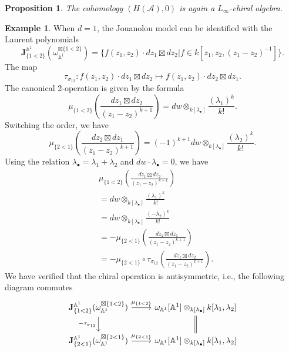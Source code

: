 \documentclass[11pt]{amsart}
\newtheorem{prop}[thm]{Proposition}
\theoremstyle{definition}
\newtheorem{exa}[thm]{Example}
\theoremstyle{remark}
\numberwithin{equation}{section}
\begin{document}
\begin{prop}
The cohomology $\left(H(\mathcal{A}),0\right)$ is again a $L_{\infty}$-chiral algebra.
\end{prop}
\begin{exa}
When $d=1$, the Jouanolou model can be identified with the Laurent polynomials
$$
\mathbf{J}^{\mathbb{A}^1}_{\{1<2\}}(\omega_{\mathbb{A}^1}^{\boxtimes\{1<2\}})=\{f(z_1,z_2)\cdot dz_1\boxtimes dz_2|f\in k[z_1,z_2,(z_1-z_2)^{-1}]\}.
$$
The map
$$
\tau_{\sigma_{12}}:f(z_1,z_2)\cdot dz_1\boxtimes dz_2\mapsto f(z_1,z_2)\cdot dz_2\boxtimes dz_1.
$$
The canonical 2-operation is given by the formula
$$
\mu_{\{1<2\}}\left(\frac{dz_1\boxtimes dz_2}{(z_1-z_2)^{k+1}}\right)=dw\otimes_{k[\lambda_{\bullet}]}\frac{(\lambda_1)^k}{k!}.
$$
Switching the order, we have
$$
\mu_{\{2<1\}}\left(\frac{dz_2\boxtimes dz_1}{(z_1-z_2)^{k+1}}\right)=(-1)^{k+1}dw\otimes_{k[\lambda_{\bullet}]}\frac{(\lambda_2)^k}{k!}.
$$
Using the relation $\lambda_{\bullet}=\lambda_1+\lambda_2$ and $dw\cdot \lambda_{\bullet}=0$, we have
\begin{align*}
   & \mu_{\{1<2\}}\left(\frac{dz_1\boxtimes dz_2}{(z_1-z_2)^{k+1}}\right)\\
   & =dw\otimes_{k[\lambda_{\bullet}]}\frac{(\lambda_1)^k}{k!}\\
   &=dw\otimes_{k[\lambda_{\bullet}]}\frac{(-\lambda_2)^k}{k!}\\
   &=-\mu_{\{2<1\}}\left(\frac{dz_2\boxtimes dz_1}{(z_1-z_2)^{k+1}}\right)\\
   &=-\mu_{\{2<1\}}\circ \tau_{\sigma_{12}}\left(\frac{dz_1\boxtimes dz_2}{(z_1-z_2)^{k+1}}\right).
\end{align*}
We have verified that the chiral operation is antisymmetric, i.e., the following diagram commutes
  $$
\begin{tikzcd}
\mathbf{J}^{\mathbb{A}^1}_{\{1<2\}}(\omega_{\mathbb{A}^1}^{\boxtimes\{1<2\}}) \arrow[r, "\mu_{\{1<2\}}"] \arrow[d, "-\tau_{\sigma_{12}}"'] & {\omega_{\mathbb{A}^1}[\mathbb{A}^1]\otimes_{k[\lambda_{\bullet}]}k[\lambda_1,\lambda_2]} \arrow[d,Rightarrow, no head] \\
\mathbf{J}^{\mathbb{A}^1}_{\{2<1\}}(\omega_{\mathbb{A}^1}^{\boxtimes\{2<1\}}) \arrow[r, "\mu_{\{2<1\}}"]                                   & {\omega_{\mathbb{A}^1}[\mathbb{A}^1]\otimes_{k[\lambda_{\bullet}]}k[\lambda_1,\lambda_2]}
\end{tikzcd}
  $$
\end{exa}
\end{document}
